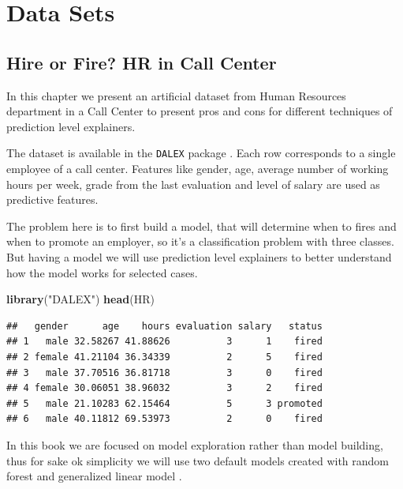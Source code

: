 \documentclass[]{book}
\newenvironment{Shaded}{\begin{snugshade}}{\end{snugshade}}
\newcommand{\KeywordTok}[1]{\textcolor[rgb]{0.13,0.29,0.53}{\textbf{#1}}}
\newcommand{\NormalTok}[1]{#1}
\newcommand{\StringTok}[1]{\textcolor[rgb]{0.31,0.60,0.02}{#1}}
\theoremstyle{definition}
\theoremstyle{definition}
\theoremstyle{definition}
\theoremstyle{remark}
\begin{document}
\hypertarget{DataSets}{%
\chapter{Data Sets}\label{DataSets}}

\hypertarget{HRdataset}{%
\section{Hire or Fire? HR in Call Center}\label{HRdataset}}

In this chapter we present an artificial dataset from Human Resources
department in a Call Center to present pros and cons for different
techniques of prediction level explainers.

The dataset is available in the \texttt{DALEX} package \citep{R-DALEX}.
Each row corresponds to a single employee of a call center. Features
like gender, age, average number of working hours per week, grade from
the last evaluation and level of salary are used as predictive features.

The problem here is to first build a model, that will determine when to
fires and when to promote an employer, so it's a classification problem
with three classes. But having a model we will use prediction level
explainers to better understand how the model works for selected cases.

\begin{Shaded}
\begin{Highlighting}[]
\KeywordTok{library}\NormalTok{(}\StringTok{"DALEX"}\NormalTok{)}
\KeywordTok{head}\NormalTok{(HR)}
\end{Highlighting}
\end{Shaded}

\begin{verbatim}
##   gender      age    hours evaluation salary   status
## 1   male 32.58267 41.88626          3      1    fired
## 2 female 41.21104 36.34339          2      5    fired
## 3   male 37.70516 36.81718          3      0    fired
## 4 female 30.06051 38.96032          3      2    fired
## 5   male 21.10283 62.15464          5      3 promoted
## 6   male 40.11812 69.53973          2      0    fired
\end{verbatim}

In this book we are focused on model exploration rather than model
building, thus for sake ok simplicity we will use two default models
created with random forest \citep{R-randomForest} and generalized linear
model \citep{R-nnet}.
\end{document}
